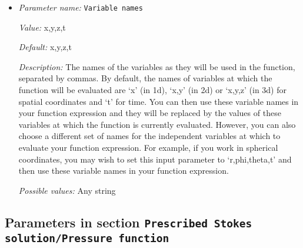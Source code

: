 \begin{itemize}
{\it Possible values:} Any string
\item {\it Parameter name:} {\tt Variable names}
\label{parameters:Prescribed Stokes solution/Fluid velocity function/Variable names}
\label{parameters:Prescribed_20Stokes_20solution/Fluid_20velocity_20function/Variable_20names}


{\it Value:} x,y,z,t


{\it Default:} x,y,z,t


{\it Description:} The names of the variables as they will be used in the function, separated by commas. By default, the names of variables at which the function will be evaluated are `x' (in 1d), `x,y' (in 2d) or `x,y,z' (in 3d) for spatial coordinates and `t' for time. You can then use these variable names in your function expression and they will be replaced by the values of these variables at which the function is currently evaluated. However, you can also choose a different set of names for the independent variables at which to evaluate your function expression. For example, if you work in spherical coordinates, you may wish to set this input parameter to `r,phi,theta,t' and then use these variable names in your function expression.


{\it Possible values:} Any string
\end{itemize}

\subsection{Parameters in section \tt Prescribed Stokes solution/Pressure function}
\label{parameters:Prescribed_20Stokes_20solution/Pressure_20function}

